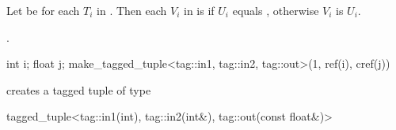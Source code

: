 \begin{addedblock}
\begin{itemdescr} \pnum Let  be  for each
$T_i$ in . Then each $V_i$ in  is
 if $U_i$ equals , otherwise
$V_i$ is $U_i$.

\pnum
\returns {}.

\pnum
\enterexample

\begin{codeblock}
int i; float j;
make_tagged_tuple<tag::in1, tag::in2, tag::out>(1, ref(i), cref(j))
\end{codeblock}

creates a tagged tuple of type

\begin{codeblock}
tagged_tuple<tag::in1(int), tag::in2(int&), tag::out(const float&)>
\end{codeblock}
\exitexample
\end{itemdescr}
\end{addedblock}
